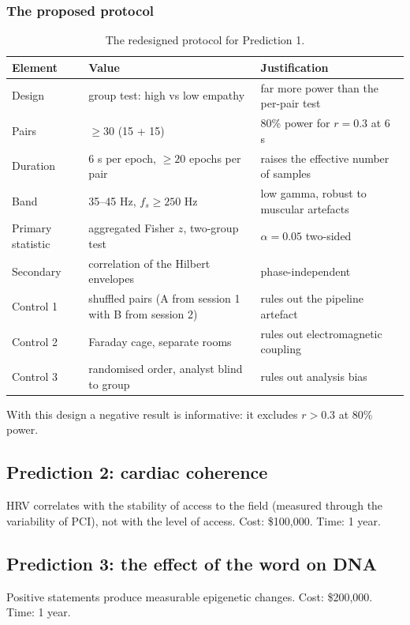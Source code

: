 \documentclass[11pt,a4paper]{article}
\begin{document}
\subsubsection*{The proposed protocol}
\begin{table}[H]
\centering
\small
\begin{tabular}{@{}p{3.2cm}p{4.6cm}p{6.2cm}@{}}
\toprule
\textbf{Element} & \textbf{Value} & \textbf{Justification} \\ \midrule
Design & group test: high vs low empathy & far more power than the per-pair test \\
Pairs & $\geq 30$ (15 + 15) & 80\% power for $r = 0.3$ at 6 s \\
Duration & 6 s per epoch, $\geq 20$ epochs per pair & raises the effective number of samples \\
Band & 35--45 Hz, $f_s \geq 250$ Hz & low gamma, robust to muscular artefacts \\
Primary statistic & aggregated Fisher $z$, two-group test & $\alpha = 0.05$ two-sided \\
Secondary & correlation of the Hilbert envelopes & phase-independent \\
Control 1 & shuffled pairs (A from session 1 with B from session 2) & rules out the pipeline artefact \\
Control 2 & Faraday cage, separate rooms & rules out electromagnetic coupling \\
Control 3 & randomised order, analyst blind to group & rules out analysis bias \\ \bottomrule
\end{tabular}
\caption{The redesigned protocol for Prediction 1.}
\label{tab:protocol}
\end{table}

With this design a negative result is informative: it excludes $r > 0.3$ at 80\% power.

\subsection{Prediction 2: cardiac coherence}
HRV correlates with the stability of access to the field (measured through the variability of PCI), not with the level of access. Cost: \$100,000. Time: 1 year.

\subsection{Prediction 3: the effect of the word on DNA}
Positive statements produce measurable epigenetic changes. Cost: \$200,000. Time: 1 year.
\end{document}

